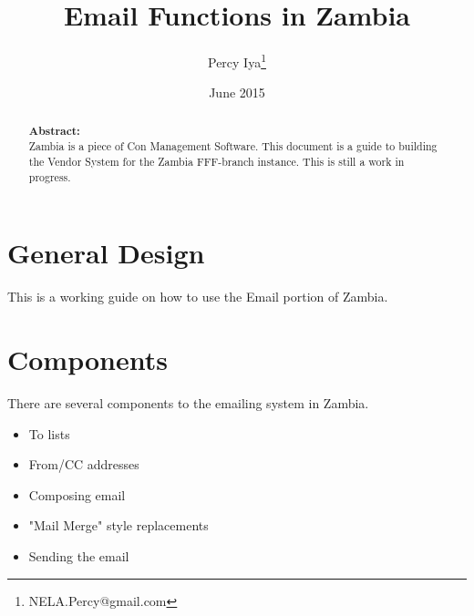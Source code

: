 \documentclass[captions=tablesignature]{scrartcl}
\author{Percy Iya\thanks{NELA.Percy@gmail.com}}
\date{June 2015}
\title{Email Functions in Zambia}
\begin{document}
\maketitle
{}
\thispagestyle{fancy}
\renewcommand{\headrulewidth}{0pt}
\renewcommand{\footrulewidth}{0pt}
\lhead{}
\rhead{}
\chead{}
\lfoot{}
\cfoot{}
\rfoot{}
\begin{abstract}
\vspace{5cm}
{\LARGE{\textbf{Abstract:\\}}}
Zambia is a piece of Con Management Software.  This document is a guide to building the Vendor System for the Zambia FFF-branch instance.  This is still a work in progress.
\end{abstract}
\newpage
\renewcommand{\headrulewidth}{1pt}
\renewcommand{\footrulewidth}{1pt}
\rfoot{\thepage}
\setcounter{tocdepth}{2}
\tableofcontents
\listoftables
\listoffigures
\newpage
{}
\section{General Design}
\label{sec-1}
This is a working guide on how to use the Email portion of Zambia.

\section{Components}
\label{sec-2}
There are several components to the emailing system in Zambia.
\begin{itemize}
\item To lists
\item From/CC addresses
\item Composing email
\item "Mail Merge" style replacements
\item Sending the email
\end{itemize}
\end{document}
